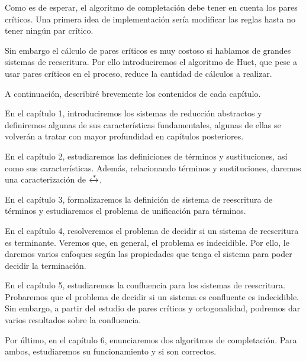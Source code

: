 Como es de esperar, el algoritmo de completación debe tener en cuenta
los pares críticos. Una primera idea de implementación sería modificar
las reglas hasta no tener ningún par crítico.

Sin embargo el cálculo de pares críticos es muy costoso si hablamos de
grandes sistemas de reescritura. Por ello introduciremos el algoritmo
de Huet, que pese a usar pares críticos en el proceso, reduce la
cantidad de cálculos a realizar.

A continuación, describiré brevemente los contenidos de cada capítulo.

En el capítulo 1, introduciremos los sistemas de reducción abstractos y
definiremos algunas de sus características fundamentales, algunas de
ellas se volverán a tratar con mayor profundidad en capítulos
posteriores.

En el capítulo 2, estudiaremos las definiciones de términos y
sustituciones, así como sus características. Además, relacionando
términos y sustituciones, daremos una caracterización de
$\xleftrightarrow{*}$,

En el capítulo 3, formalizaremos la definición de sistema de
reescritura de términos y estudiaremos el problema de unificación para
términos.

En el capítulo 4, resolveremos el problema de decidir si un sistema de
reescritura es terminante. Veremos que, en general, el problema es
indecidible. Por ello, le daremos varios enfoques según las
propiedades que tenga el sistema para poder decidir la terminación.

En el capítulo 5, estudiaremos la confluencia para los sistemas de
reescritura. Probaremos que el problema de decidir si un sistema es
confluente es indecidible. Sin embargo, a partir del estudio de pares
críticos y ortogonalidad, podremos dar varios resultados sobre la
confluencia.

Por último, en el capítulo 6, enunciaremos dos algoritmos de
completación. Para ambos, estudiaremos su funcionamiento y si son
correctos.

